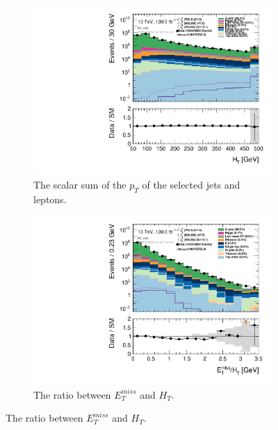 \begin{figure}[H]\ContinuedFloat
\centering
    \begin{subfigure}[t!]{0.49\textwidth}
        \includegraphics[width=\textwidth]{Figures/SlepSlep/CutAndCount/ML_cuts/hist1d_HT_ML_cuts.pdf}
    \caption{The scalar sum of the $p_T$ of the selected jets and leptons.}
    \label{fig:my_label}
    \end{subfigure}
    \begin{subfigure}[t!]{0.49\textwidth}
        \includegraphics[width=\textwidth]{Figures/SlepSlep/CutAndCount/ML_cuts/hist1d_met_HT_ML_cuts.pdf}
    \caption{The ratio between $E_T^{miss}$ and $H_T$.}
    \label{fig:my_label}

\end{subfigure}
\end{figure}
